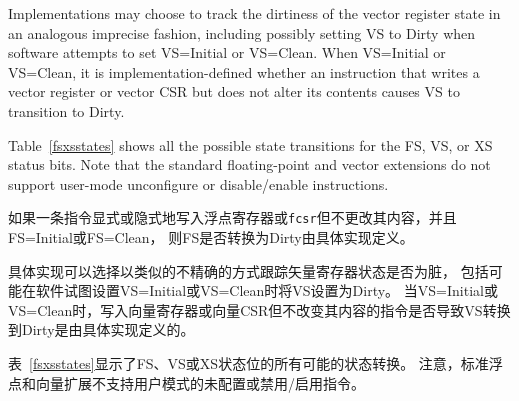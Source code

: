 Implementations may choose to track the dirtiness of the vector register state in an
analogous imprecise fashion, including possibly setting VS to Dirty when
software attempts to set VS=Initial or VS=Clean.
When VS=Initial or VS=Clean, it is implementation-defined whether an
instruction that writes a vector register or vector CSR but does not alter its
contents causes VS to transition to Dirty.

Table~\ref{fsxsstates} shows all the possible state transitions for
the FS, VS, or XS status bits.  Note that the standard floating-point
and vector extensions do not support user-mode unconfigure or disable/enable
instructions.
\fi

如果一条指令显式或隐式地写入浮点寄存器或{\tt fcsr}但不更改其内容，并且FS=Initial或FS=Clean，
则FS是否转换为Dirty由具体实现定义。

具体实现可以选择以类似的不精确的方式跟踪矢量寄存器状态是否为脏，
包括可能在软件试图设置VS=Initial或VS=Clean时将VS设置为Dirty。
当VS=Initial或VS=Clean时，写入向量寄存器或向量CSR但不改变其内容的指令是否导致VS转换到Dirty是由具体实现定义的。

表~\ref{fsxsstates}显示了FS、VS或XS状态位的所有可能的状态转换。
注意，标准浮点和向量扩展不支持用户模式的未配置或禁用/启用指令。

